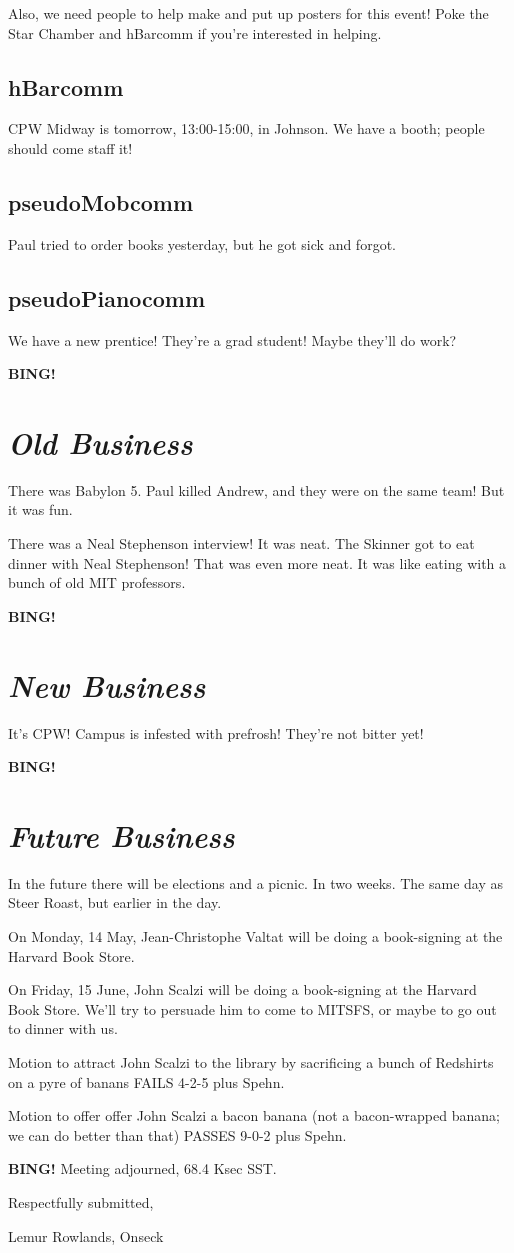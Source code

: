 \documentclass[10pt]{article}
\newcommand{\bing}{{\bf BING!} }
\newcommand{\goto}[1]{\bing \vskip 12pt \section*{{\em{#1}}}}
\newcommand{\ps}{ plus Spehn\xspace}
\newcommand{\onseck}{Lemur Rowlands, Onseck}
\begin{document}
Also, we need people to help make and put up posters for this event!
Poke the Star Chamber and hBarcomm if you're interested in helping.


\subsection*{hBarcomm}

CPW Midway is tomorrow, 13:00-15:00, in Johnson.  We have a booth;
people should come staff it!


\subsection*{pseudoMobcomm}

Paul tried to order books yesterday, but he got sick and forgot.


\subsection*{pseudoPianocomm}

We have a new prentice!  They're a grad student!  Maybe they'll do work?


\goto{Old Business}

There was Babylon 5.  Paul killed Andrew, and they were on the same
team!  But it was fun.

There was a Neal Stephenson interview!  It was neat.  The Skinner got
to eat dinner with Neal Stephenson!  That was even more neat.  It was
like eating with a bunch of old MIT professors.


\goto{New Business}

It's CPW!  Campus is infested with prefrosh!  They're not bitter
yet!


\goto{Future Business}

In the future there will be elections and a picnic.  In two weeks.
The same day as Steer Roast, but earlier in the day.

On Monday, 14 May, Jean-Christophe Valtat will be doing a book-signing
at the Harvard Book Store.

On Friday, 15 June, John Scalzi will be doing a book-signing at the
Harvard Book Store.  We'll try to persuade him to come to MITSFS, or
maybe to go out to dinner with us.

Motion to attract John Scalzi to the library by sacrificing a bunch
of Redshirts on a pyre of banans FAILS 4-2-5\ps.

Motion to offer offer John Scalzi a bacon banana (not a bacon-wrapped
banana; we can do better than that) PASSES 9-0-2\ps.

\bing
\noindent
Meeting adjourned, 68.4 Ksec SST.

\vspace{18pt}

\centerline{Respectfully submitted,}
\centerline{\onseck}
\end{document}
